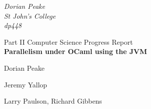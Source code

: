 \begin{titlepage}

\begin{flushright}
{\large \emph{Dorian Peake\\
      St John's College\\
      dp448}}
\end{flushright}

\vspace{3cm}

\begin{center}
{\LARGE Part II Computer Science Progress Report}\\[1cm]
{\LARGE \bfseries Parallelism under OCaml using the JVM}\\[0.5cm]

\vspace{3cm}

\begin{description}
{\large
\item[Project Originator:]Dorian Peake\\[1cm]
\item[Project Supervisor:]Jeremy Yallop\\[1cm]
\item[Project Overseers:]Larry Paulson, Richard Gibbens\\[1cm]
}
\end{description}
\end{center}
\end{titlepage}
